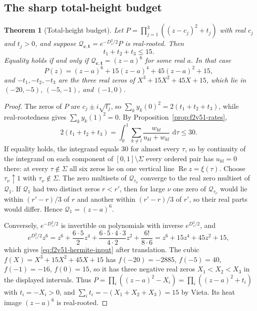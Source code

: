 \documentclass[11pt]{article}
\newtheorem{theorem}{Theorem}[section]
\theoremstyle{definition}
\theoremstyle{remark}
\newcommand{\dd}{\,\mathrm d}
\begin{document}
\subsection{The sharp total-height budget}

\begin{theorem}[Total-height budget]
\label{thm:f2v51-budget}
Let \(P=\prod_{j=1}^3((z-c_j)^2+t_j)\) with real \(c_j\) and \(t_j>0\),
and suppose \(\mathcal Q_{\bm c,\bm t}=e^{-D_z^2/2}P\) is real-rooted.
Then
\begin{equation}
 \boxed{t_1+t_2+t_3\le15.}
 \label{eq:f2v51-budget}
\end{equation}
Equality holds if and only if \(\mathcal Q_{\bm c,\bm t}=(z-a)^6\) for
some real \(a\).  In that case
\begin{equation}
 P(z)=(z-a)^6+15(z-a)^4+45(z-a)^2+15,
 \label{eq:f2v51-hermite-input}
\end{equation}
and \(-t_1,-t_2,-t_3\) are the three real zeros of
\(X^3+15X^2+45X+15\), which lie in \((-20,-5)\), \((-5,-1)\), and
\((-1,0)\).
\end{theorem}

\begin{proof}
The zeros of \(P\) are \(c_j\pm i\sqrt{t_j}\), so
\(\sum_ky_k(0)^2=2(t_1+t_2+t_3)\), while real-rootedness gives
\(\sum_ky_k(1)^2=0\).  By Proposition~\ref{prop:f2v51-rates},
\begin{equation}
 2(t_1+t_2+t_3)
 =\int_0^1\sum_{k\ne l}\frac{w_{kl}}{u_{kl}+w_{kl}}\,\dd\tau
 \le30.
 \label{eq:f2v51-budget-integral}
\end{equation}
If equality holds, the integrand equals \(30\) for almost every
\(\tau\), so by continuity of the integrand on each component of
\([0,1]\setminus\Sigma\) every ordered pair has \(u_{kl}=0\) there: at
every \(\tau\notin\Sigma\) all six zeros lie on one vertical line
\(\operatorname{Re}z=\xi(\tau)\).  Choose \(\tau_\nu\uparrow1\) with
\(\tau_\nu\notin\Sigma\).  The zero multisets of
\(\mathcal Q_{\tau_\nu}\) converge to the real zero multiset of
\(\mathcal Q_1\).  If \(\mathcal Q_1\) had two distinct zeros
\(r<r'\), then for large \(\nu\) one zero of \(\mathcal Q_{\tau_\nu}\)
would lie within \((r'-r)/3\) of \(r\) and another within
\((r'-r)/3\) of \(r'\), so their real parts would differ.  Hence
\(\mathcal Q_1=(z-a)^6\).

Conversely, \(e^{-D_z^2/2}\) is invertible on polynomials with inverse
\(e^{D_z^2/2}\), and
\[
 e^{D_z^2/2}z^6
 =z^6+\frac{6\cdot5}{2}z^4+\frac{6\cdot5\cdot4\cdot3}{4\cdot2}z^2
  +\frac{6!}{8\cdot6}
 =z^6+15z^4+45z^2+15,
\]
which gives \eqref{eq:f2v51-hermite-input} after translation.  The cubic
\(f(X)=X^3+15X^2+45X+15\) has
\(f(-20)=-2885\), \(f(-5)=40\), \(f(-1)=-16\), \(f(0)=15\), so it has
three negative real zeros \(X_1<X_2<X_3\) in the displayed intervals.
Thus \(P=\prod_i((z-a)^2-X_i)=\prod_i((z-a)^2+t_i)\) with
\(t_i=-X_i>0\), and \(\sum_it_i=-(X_1+X_2+X_3)=15\) by Vieta.  Its heat
image \((z-a)^6\) is real-rooted.
\end{proof}
\end{document}
